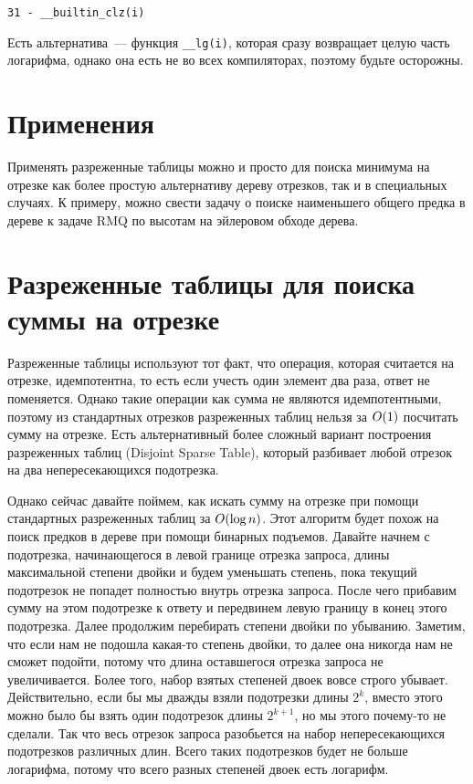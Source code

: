 \verb+31 - __builtin_clz(i)+

\begin{observation}
    Есть альтернатива~--- функция \verb+__lg(i)+, которая сразу возвращает целую часть логарифма, однако она есть не во всех компиляторах, поэтому будьте осторожны.
\end{observation}

\section{Применения}

Применять разреженные таблицы можно и просто для поиска минимума на отрезке как более простую альтернативу дереву отрезков, так и в специальных случаях. К примеру, можно свести задачу о поиске наименьшего общего предка в дереве к задаче RMQ по высотам на эйлеровом обходе дерева.

\section{Разреженные таблицы для поиска суммы на отрезке}

Разреженные таблицы используют тот факт, что операция, которая считается на отрезке, идемпотентна, то есть если учесть один элемент два раза, ответ не поменяется. Однако такие операции как сумма не являются идемпотентными, поэтому из стандартных отрезков разреженных таблиц нельзя за $O(1)$ посчитать сумму на отрезке. Есть альтернативный более сложный вариант построения разреженных таблиц (Disjoint Sparse Table), который разбивает любой отрезок на два непересекающихся подотрезка.

Однако сейчас давайте поймем, как искать сумму на отрезке при помощи стандартных разреженных таблиц за $O(\log n)$. Этот алгоритм будет похож на поиск предков в дереве при помощи бинарных подъемов. Давайте начнем с подотрезка, начинающегося в левой границе отрезка запроса, длины максимальной степени двойки и будем уменьшать степень, пока текущий подотрезок не попадет полностью внутрь отрезка запроса. После чего прибавим сумму на этом подотрезке к ответу и передвинем левую границу в конец этого подотрезка. Далее продолжим перебирать степени двойки по убыванию. Заметим, что если нам не подошла какая-то степень двойки, то далее она никогда нам не сможет подойти, потому что длина оставшегося отрезка запроса не увеличивается. Более того, набор взятых степеней двоек вовсе строго убывает. Действительно, если бы мы дважды взяли подотрезки длины $2^k$, вместо этого можно было бы взять один подотрезок длины $2^{k + 1}$, но мы этого почему-то не сделали. Так что весь отрезок запроса разобьется на набор непересекающихся подотрезков различных длин. Всего таких подотрезков будет не больше логарифма, потому что всего разных степеней двоек есть логарифм.

